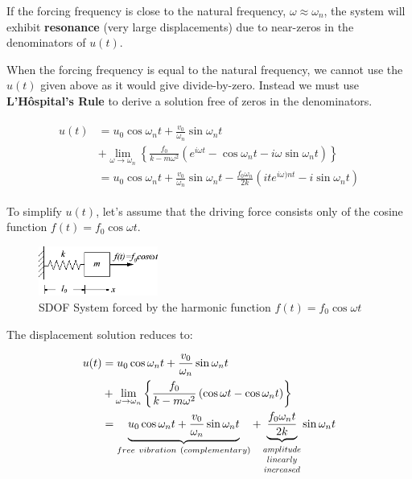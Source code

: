 \documentclass[10pt,b5paper,titlepage]{book}
\newcommand*{\Scale}[2][4]{\scalebox{#1}{$#2$}}%
\newenvironment{eqarray}
{
    \begin{eqnarray}
        \begin{aligned}
}
{
        \end{aligned}
    \end{eqnarray}
}
\begin{document}
If the forcing frequency is close to the natural frequency, $ \omega \approx \omega_n $,
the system will exhibit \textbf{resonance} (very large displacements) due to
near-zeros in the denominators of $ u(t) $.

When the forcing frequency is equal to the natural frequency, we cannot use the
$ u(t) $ given above as it would give divide-by-zero. Instead we must use
\textbf{L'H\^ospital's Rule} to derive a solution free of zeros in the denominators.

\begin{eqarray}
    u(t) &= u_0 \cos{\omega_n t} + \frac{v_0}{\omega_n} \sin{\omega_n t}\\
         &+ \lim_{\omega \rightarrow \omega_n} \left\{
             \frac{f_0}{k - m \omega^2} \left(
                 e^{i \omega t} - \cos{\omega_n t} - i \omega \sin{\omega_n t}
                 \right)
         \right\}\\
         &= u_0 \cos{\omega_n t} + \frac{v_0}{\omega_n} \sin{\omega_n t}
         - \frac{f_0 \omega_n}{2 k} \left(
             i t e^{i \omega)n t} - i \sin{\omega_n t}
             \right)
\end{eqarray}

To simplify $ u(t) $, let's assume that the driving force consists only of the
cosine function $ f(t) = f_0 \cos{\omega t} $.

\begin{figure}[ht]
    \centering
    \includegraphics[width=0.35\textwidth]{img/SDOF_harmonic_undamped.png}
    \caption{SDOF System forced by the harmonic function $ f(t) = f_0 \cos{\omega t} $}
    \label{fig:SDOF-harmonic-undamped-response-png}
\end{figure}

The displacement solution reduces to:

\begin{eqarray}
    u(t) &= u_0 \cos{\omega_n t} + \frac{v_0}{\omega_n} \sin{\omega_n t}\\
         &+ \lim_{\omega \rightarrow \omega_n} \left\{
             \frac{f_0}{k - m \omega^2} \left(
                 \cos{\omega t} - \cos{\omega_n t}
                 \right)
         \right\}\\
         &= \underbrace{u_0 \cos{\omega_n t} + \frac{v_0}{\omega_n} \sin{\omega_n t}}_{
         free\ vibration\ (complementary)}
         + \underbrace{\frac{f_0 \omega_n t}{2 k}}_{\Scale[0.75]{
             \begin{matrix}
                 amplitude\\
                 linearly\\
                 increased
             \end{matrix}}}
         \sin{\omega_n t}
\end{eqarray}
\end{document}
